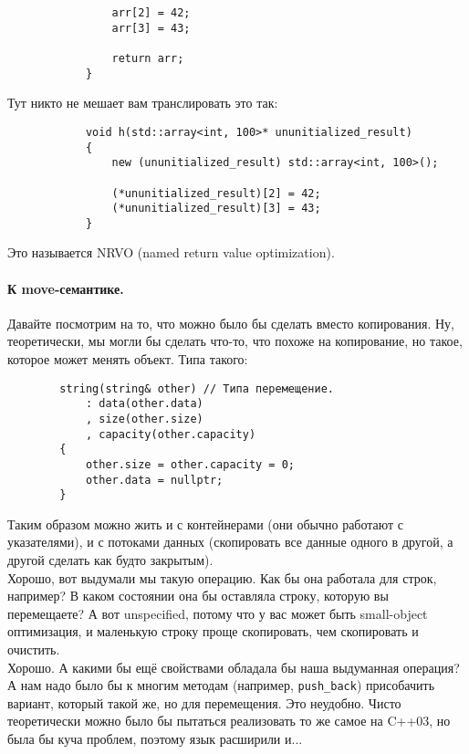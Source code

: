 \documentclass{article}
\begin{document}
\begin{itemize}
\begin{verbatim}
                arr[2] = 42;
                arr[3] = 43;

                return arr;
            }
        \end{verbatim}
        Тут никто не мешает вам транслировать это так:
        \begin{verbatim}
            void h(std::array<int, 100>* ununitialized_result)
            {
                new (ununitialized_result) std::array<int, 100>();
                
                (*ununitialized_result)[2] = 42;
                (*ununitialized_result)[3] = 43;
            }
        \end{verbatim}
        Это называется NRVO (named return value optimization).
    \end{itemize}
    \paragraph{К move-семантике.}
    Давайте посмотрим на то, что можно было бы сделать вместо копирования. Ну, теоретически, мы могли бы сделать что-то, что похоже на копирование, но такое, которое может менять объект. Типа такого:
    \begin{verbatim}
        string(string& other) // Типа перемещение.
            : data(other.data)
            , size(other.size)
            , capacity(other.capacity)
        {
            other.size = other.capacity = 0;
            other.data = nullptr;
        }
    \end{verbatim}
    Таким образом можно жить и с контейнерами (они обычно работают с указателями), и с потоками данных (скопировать все данные одного в другой, а другой сделать как будто закрытым).\\
    Хорошо, вот выдумали мы такую операцию. Как бы она работала для строк, например? В каком состоянии она бы оставляла строку, которую вы перемещаете? А вот unspecified, потому что у вас может быть small-object оптимизация, и маленькую строку проще скопировать, чем скопировать и очистить.\\
    Хорошо. А какими бы ещё свойствами обладала бы наша выдуманная операция? А нам надо было бы к многим методам (например, \texttt{push_back}) присобачить вариант, который такой же, но для перемещения. Это неудобно. Чисто теоретически можно было бы пытаться реализовать то же самое на C++03, но была бы куча проблем, поэтому язык расширили и...
\end{document}
